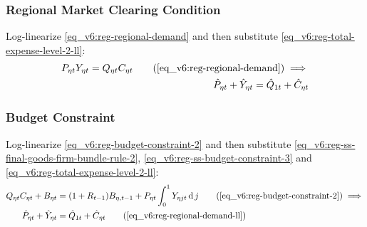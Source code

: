 \documentclass[../thesis.tex]{subfiles}
\begin{document}
	
	\begin{comment}
		Define the regional weights $\langle \begin{matrix} \theta_{PY1} & (1-\theta_{PY1}) \end{matrix} \rangle$ in the gross domestic production:
		\begin{align}
			\left\langle \begin{matrix} \theta_{PY1} & (1-\theta_{PY1}) \end{matrix} \right\rangle \coloneq \left\langle \begin{matrix} \frac{P_{1} Y_{1}}{P Y} & \frac{P_{2} Y_{2}}{PY} \end{matrix} \right\rangle \label{eq_v6:reg-ss-PYn-weight-in-PY}
		\end{align}
		
		Substitute \ref{eq_v6:reg-ss-PYn-weight-in-PY} in \ref{eq_v6:reg-ll-national-price-level}:
		
	\end{comment}


\subsubsection*{Regional Market Clearing Condition}

Log-linearize \ref{eq_v6:reg-regional-demand} and then substitute \ref{eq_v6:reg-total-expense-level-2-ll}:
\begin{align}
	P_{\eta t} Y_{\eta t} = Q_{\eta t} C_{\eta t} \tag{\ref{eq_v6:reg-regional-demand}} \implies \\
	\hat{P}_{\eta t} + \hat{Y}_{\eta t} = \hat{Q}_{1t} + \hat{C}_{\eta t} \label{eq_v6:reg-regional-demand-ll}
\end{align}


\subsubsection*{Budget Constraint}

Log-linearize \ref{eq_v6:reg-budget-constraint-2} and then substitute \ref{eq_v6:reg-ss-final-goods-firm-bundle-rule-2}, \ref{eq_v6:reg-ss-budget-constraint-3} and \ref{eq_v6:reg-total-expense-level-2-ll}:
\begin{align}
	Q_{\eta t} C_{\eta t} + B_{\eta t} &= (1 + R_{t-1}) B_{\eta,t-1} + P_{\eta t} \int_{0}^{1} Y_{\eta jt} \dif j \tag{\ref{eq_v6:reg-budget-constraint-2}} \implies \\
	\hat{P}_{\eta t} + \hat{Y}_{\eta t} &= \hat{Q}_{1t} + \hat{C}_{\eta t} \tag{\ref{eq_v6:reg-regional-demand-ll}}
\end{align}
\end{document}
